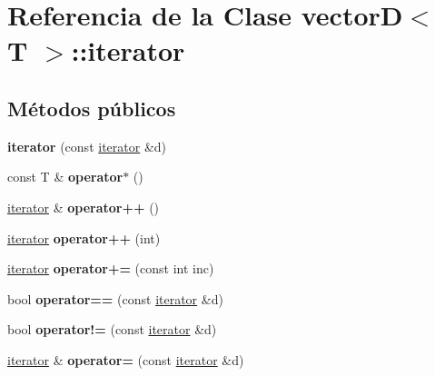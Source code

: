 \hypertarget{classvectorD_1_1iterator}{}\section{Referencia de la Clase vectorD$<$ T $>$\+:\+:iterator}
\label{classvectorD_1_1iterator}
\subsection*{Métodos públicos}
\begin{DoxyCompactItemize}
\item 
\mbox{\label{classvectorD_1_1iterator_a25bf55ca2ed864754cbf3108193c82dd}} 
{\bfseries iterator} (const \hyperlink{classvectorD_1_1iterator}{iterator} \&d)
\item 
\mbox{\label{classvectorD_1_1iterator_acc6ccde518e3b403d6377b070b8f8f62}} 
const T \& {\bfseries operator$\ast$} ()
\item 
\mbox{\label{classvectorD_1_1iterator_a7c43ff43590ac4a545cd0af9bd3d75e0}} 
\hyperlink{classvectorD_1_1iterator}{iterator} \& {\bfseries operator++} ()
\item 
\mbox{\label{classvectorD_1_1iterator_a4b745a28f11ae0be69ba153a7b8193d9}} 
\hyperlink{classvectorD_1_1iterator}{iterator} {\bfseries operator++} (int)
\item 
\mbox{\label{classvectorD_1_1iterator_a170f1248cc69a45b12830385f52fb601}} 
\hyperlink{classvectorD_1_1iterator}{iterator} {\bfseries operator+=} (const int inc)
\item 
\mbox{\label{classvectorD_1_1iterator_a654737f5af55f4ed5c879700801e5d59}} 
bool {\bfseries operator==} (const \hyperlink{classvectorD_1_1iterator}{iterator} \&d)
\item 
\mbox{\label{classvectorD_1_1iterator_aa7333de509647a3517ede81e88a37a06}} 
bool {\bfseries operator!=} (const \hyperlink{classvectorD_1_1iterator}{iterator} \&d)
\item 
\mbox{\label{classvectorD_1_1iterator_a291e8f510011f4358466e7d446b9530c}} 
\hyperlink{classvectorD_1_1iterator}{iterator} \& {\bfseries operator=} (const \hyperlink{classvectorD_1_1iterator}{iterator} \&d)
\end{DoxyCompactItemize}
